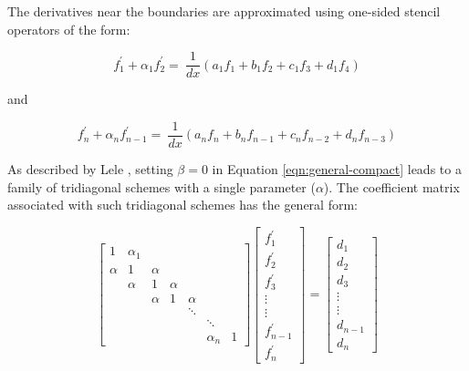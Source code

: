 \documentclass{elsarticle}
\begin{document}
The derivatives near the boundaries are approximated using
one-sided stencil operators of the form:

\begin{equation}
f^{\prime}_1 + \alpha_1 f^{\prime}_2 = \
    \frac{1}{dx} (a_1 f_1 + b_1 f_2 + c_1 f_3 + d_1 f_4) 
\end{equation}

and 

\begin{equation}
    f^{\prime}_n + \alpha_n f^{\prime}_{n-1} = \
    \frac{1}{dx} (a_n f_n + b_n f_{n-1} + c_n f_{n-2} + d_n f_{n-3}) 
\end{equation}

As described by Lele \cite{lele1992compact},
setting $\beta = 0$ in Equation \ref{eqn:general-compact} leads to
a family of tridiagonal schemes with a single parameter ($\alpha$).
The coefficient matrix associated with such tridiagonal schemes
has the general form:

\begin{equation} \label{eqn:compact-tridiagonal-system}
\begin{bmatrix}
     1 &  \alpha_1  \\
     \alpha   &  1   &  \alpha \\
         &  \alpha   &  1  &  \alpha  \\
         &      &  \alpha  &  1  &  \alpha  \\
         &      &     &     &  \ddots \\
         &      &     &     &     &  \ddots  \\
         &      &     &     &     &  \alpha_n &  1
\end{bmatrix}
\begin{bmatrix}
    f^{\prime}_1 \\
    f^{\prime}_2 \\
    f^{\prime}_3 \\
    \vdots \\
    \vdots \\
    f^{\prime}_{n-1} \\
    f^{\prime}_n
 \end{bmatrix}
=
\begin{bmatrix}
   d_1 \\
   d_2 \\
   d_3 \\
   \vdots \\
   \vdots \\
   d_{n-1} \\
   d_{n}
\end{bmatrix}
\end{equation}
\end{document}
